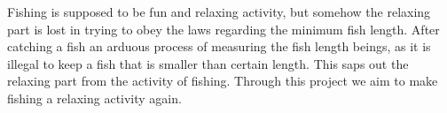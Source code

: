 Fishing is supposed to be fun and relaxing activity, but somehow the relaxing part is lost in trying to obey the laws regarding the minimum fish length. After catching a fish an arduous process of measuring the fish length beings, as it is illegal to keep a fish that is smaller than certain length. This saps out the relaxing part from the activity of fishing. Through this project we aim to make fishing a relaxing activity again. 